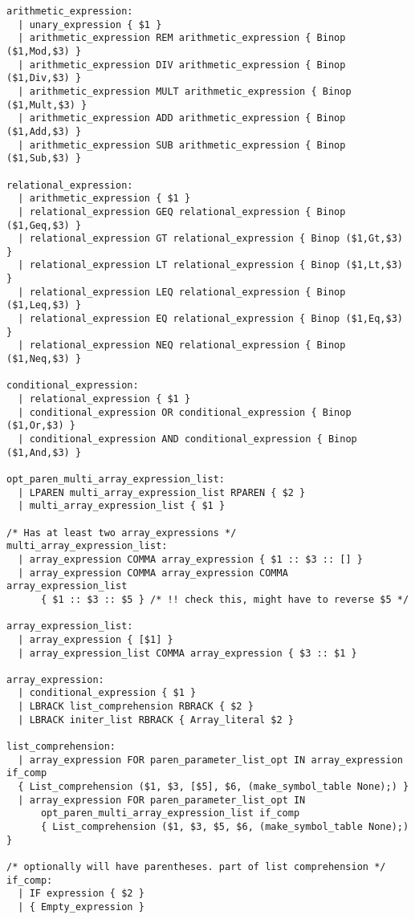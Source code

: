 \begin{verbatim}
arithmetic_expression:
  | unary_expression { $1 }
  | arithmetic_expression REM arithmetic_expression { Binop ($1,Mod,$3) }
  | arithmetic_expression DIV arithmetic_expression { Binop ($1,Div,$3) }
  | arithmetic_expression MULT arithmetic_expression { Binop ($1,Mult,$3) }
  | arithmetic_expression ADD arithmetic_expression { Binop ($1,Add,$3) }
  | arithmetic_expression SUB arithmetic_expression { Binop ($1,Sub,$3) }

relational_expression:
  | arithmetic_expression { $1 }
  | relational_expression GEQ relational_expression { Binop ($1,Geq,$3) }
  | relational_expression GT relational_expression { Binop ($1,Gt,$3) }
  | relational_expression LT relational_expression { Binop ($1,Lt,$3) }
  | relational_expression LEQ relational_expression { Binop ($1,Leq,$3) }
  | relational_expression EQ relational_expression { Binop ($1,Eq,$3) }
  | relational_expression NEQ relational_expression { Binop ($1,Neq,$3) }

conditional_expression:
  | relational_expression { $1 }
  | conditional_expression OR conditional_expression { Binop ($1,Or,$3) }
  | conditional_expression AND conditional_expression { Binop ($1,And,$3) }

opt_paren_multi_array_expression_list:
  | LPAREN multi_array_expression_list RPAREN { $2 }
  | multi_array_expression_list { $1 }

/* Has at least two array_expressions */
multi_array_expression_list:
  | array_expression COMMA array_expression { $1 :: $3 :: [] }
  | array_expression COMMA array_expression COMMA array_expression_list
      { $1 :: $3 :: $5 } /* !! check this, might have to reverse $5 */

array_expression_list:
  | array_expression { [$1] }
  | array_expression_list COMMA array_expression { $3 :: $1 }

array_expression:
  | conditional_expression { $1 }
  | LBRACK list_comprehension RBRACK { $2 } 
  | LBRACK initer_list RBRACK { Array_literal $2 }

list_comprehension:
  | array_expression FOR paren_parameter_list_opt IN array_expression if_comp
  { List_comprehension ($1, $3, [$5], $6, (make_symbol_table None);) }
  | array_expression FOR paren_parameter_list_opt IN
      opt_paren_multi_array_expression_list if_comp
      { List_comprehension ($1, $3, $5, $6, (make_symbol_table None);) }

/* optionally will have parentheses. part of list comprehension */
if_comp:
  | IF expression { $2 }
  | { Empty_expression }


\end{verbatim}

